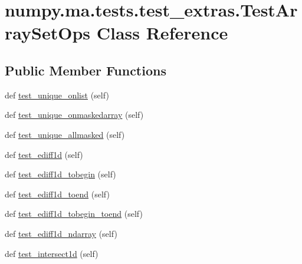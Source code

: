 \hypertarget{classnumpy_1_1ma_1_1tests_1_1test__extras_1_1TestArraySetOps}{}\section{numpy.\+ma.\+tests.\+test\+\_\+extras.\+Test\+Array\+Set\+Ops Class Reference}
\label{classnumpy_1_1ma_1_1tests_1_1test__extras_1_1TestArraySetOps}
\subsection*{Public Member Functions}
\begin{DoxyCompactItemize}
\item 
def \hyperlink{classnumpy_1_1ma_1_1tests_1_1test__extras_1_1TestArraySetOps_a476a786e8385abf23023e93cdb2255cc}{test\+\_\+unique\+\_\+onlist} (self)
\item 
def \hyperlink{classnumpy_1_1ma_1_1tests_1_1test__extras_1_1TestArraySetOps_a593ca60d4532695648bcf292678dd9c1}{test\+\_\+unique\+\_\+onmaskedarray} (self)
\item 
def \hyperlink{classnumpy_1_1ma_1_1tests_1_1test__extras_1_1TestArraySetOps_aea6a049fea576f907d992faa43348425}{test\+\_\+unique\+\_\+allmasked} (self)
\item 
def \hyperlink{classnumpy_1_1ma_1_1tests_1_1test__extras_1_1TestArraySetOps_a98c404aca51dc59c137be122497f3a53}{test\+\_\+ediff1d} (self)
\item 
def \hyperlink{classnumpy_1_1ma_1_1tests_1_1test__extras_1_1TestArraySetOps_a9fc175801c7e26984607e9ae836dcb20}{test\+\_\+ediff1d\+\_\+tobegin} (self)
\item 
def \hyperlink{classnumpy_1_1ma_1_1tests_1_1test__extras_1_1TestArraySetOps_a29107eaf0ebcccf87985ea2a48cb7ada}{test\+\_\+ediff1d\+\_\+toend} (self)
\item 
def \hyperlink{classnumpy_1_1ma_1_1tests_1_1test__extras_1_1TestArraySetOps_a2a0df72cf1818a5681ddc32b0d1298e8}{test\+\_\+ediff1d\+\_\+tobegin\+\_\+toend} (self)
\item 
def \hyperlink{classnumpy_1_1ma_1_1tests_1_1test__extras_1_1TestArraySetOps_a8ae99ee95fd3e1bfb6d5edf044001c82}{test\+\_\+ediff1d\+\_\+ndarray} (self)
\item 
def \hyperlink{classnumpy_1_1ma_1_1tests_1_1test__extras_1_1TestArraySetOps_a558b012692cc06b7ebd7d5d92ef18f6c}{test\+\_\+intersect1d} (self)
\item 

\end{DoxyCompactItemize}
